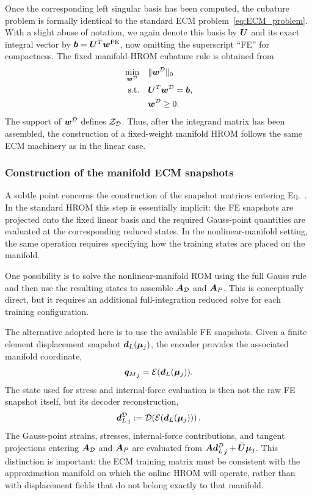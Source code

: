 \documentclass[11pt,a4paper]{article}
\begin{document}
Once the corresponding left singular basis has been computed, the cubature
problem is formally identical to the standard ECM problem~\ref{eq:ECM_problem}. With a slight abuse
of notation, we again denote this basis by $\bm{U}$ and its exact integral vector
by $\bm{b}= \bm{U}^T\bm{w}^{\mathrm{FE}}$, now omitting the superscript ``FE'' for compactness. The fixed
manifold-HROM cubature rule is obtained from
\begin{equation}
\label{eq:ECM_problem_manifold_fixed}
\begin{aligned}
    \min_{\bm{w}^{\mathcal{D}}} \quad & \|\bm{w}^{\mathcal{D}}\|_0 \\
    \text{s.t.} \quad & \bm{U}^T \bm{w}^{\mathcal{D}} = \bm{b}, \\
                      & \bm{w}^{\mathcal{D}} \ge 0 .
\end{aligned}
\end{equation}
The support of $\bm{w}^{\mathcal{D}}$ defines $\mathcal{Z}_{\mathcal{D}}$. Thus, after the integrand matrix has been
assembled, the construction of a fixed-weight manifold HROM follows the same
ECM machinery as in the linear case.

\subsubsection{Construction of the manifold ECM snapshots}
\label{subsubsec:manifold_ECM_snapshots}

A subtle point concerns the construction of the snapshot matrices entering
Eq.~. In the standard HROM this
step is essentially implicit: the FE snapshots are projected onto the fixed
linear basis and the required Gauss-point quantities are evaluated at the
corresponding reduced states. In the nonlinear-manifold setting, the same
operation requires specifying how the training states are placed on the
manifold.

One possibility is to solve the nonlinear-manifold ROM using the full Gauss
rule and then use the resulting states to assemble $\bm{A}_{\mathcal{D}}$ and $\bm{A}_{P}$. This
is conceptually direct, but it requires an additional full-integration reduced
solve for each training configuration.

The alternative adopted here is to use the available FE snapshots. Given a
finite element displacement snapshot $\bm{d}_L(\bm{\mu}_j)$, the encoder provides
the associated manifold coordinate,
\[
    {\bm{q}_M}_j = \mathcal{\boldsymbol{E}}(\bm{d}_L(\bm{\mu}_j)).
\]
The state used for stress and internal-force evaluation is then not the raw FE
snapshot itself, but its decoder reconstruction,
\begin{equation}
\label{eq:dredD_definition}
    {\bm{d}_L^{\mathcal{D}}}_j
    :=
    \mathcal{\boldsymbol{D}}\!\left(\mathcal{\boldsymbol{E}}(\bm{d}_L(\bm{\mu}_j))\right).
\end{equation}
The Gauss-point strains, stresses, internal-force contributions, and tangent
projections entering $\bm{A}_{\mathcal{D}}$ and $\bm{A}_{P}$ are evaluated from
$\bm{A}{\bm{d}_L^{\mathcal{D}}}_j+\bar{\bm{U}}\bm{\mu}_j$. This distinction is important: the ECM
training matrix must be consistent with the approximation manifold on which
the online HROM will operate, rather than with displacement fields that do not
belong exactly to that manifold.
\end{document}
